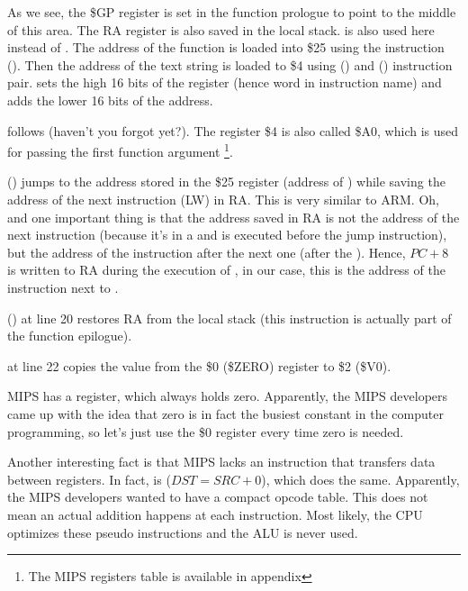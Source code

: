 As we see, the \$GP register is set in the function prologue to point to the middle of this area.
The \ac{RA} register is also saved in the local stack.
\puts is also used here instead of \printf.
The address of the \puts function is loaded into \$25 using  the instruction ().
Then the address of the text string is loaded to \$4 using  () and 
 () instruction pair.
 sets the high 16 bits of the register (hence  word in instruction name) and  adds
the lower 16 bits of the address.

 follows  (haven't you forgot  yet?).
The register \$4 is also called \$A0, which is used for passing the first function argument
\footnote{The MIPS registers table is available in appendix }.


 () jumps to the address stored in the \$25 register (address of \puts) 
while saving the address of the next instruction (LW) in \ac{RA}.
This is very similar to ARM.
Oh, and one important thing is that the address saved in \ac{RA} is not the address of the next instruction (because
it's in a  and is executed before the jump instruction),
but the address of the instruction after the next one (after the ).
Hence, $PC + 8$ is written to \ac{RA} during the execution of , in our case, this is the address of the 
instruction next to .

 () at line 20 restores \ac{RA} from the local stack (this instruction is actually part of the function epilogue).


 at line 22 copies the value from the \$0 (\$ZERO) register to \$2 (\$V0).
\label{MIPS_zero_register}

MIPS has a  register, which always holds zero.
Apparently, the MIPS developers came up with the idea that zero is in fact the busiest constant in the computer programming,
so let's just use the \$0 register every time zero is needed.

Another interesting fact is that MIPS lacks an instruction that transfers data between registers.
In fact,  is  ($DST=SRC+0$), which does the same.
Apparently, the MIPS developers wanted to have a compact opcode table.
This does not mean an actual addition happens at each  instruction.
Most likely, the \ac{CPU} optimizes these pseudo instructions and the \ac{ALU} is never used.

